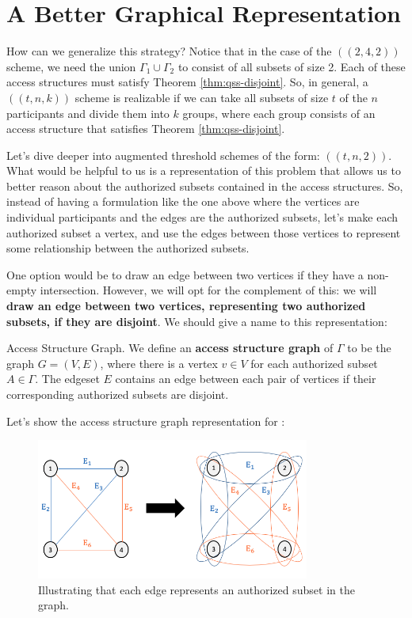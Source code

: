 \section{A Better Graphical Representation}

How can we generalize this strategy? Notice that in the case of the $((2,4,2))$ scheme, we need the union $\Gamma_1 \cup \Gamma_2$ to consist of all subsets of size 2. Each of these access structures must satisfy Theorem \ref{thm:qss-disjoint}. So, in general, a $((t,n,k))$ scheme is realizable if we can take all subsets of size $t$ of the $n$ participants and divide them into $k$ groups, where each group consists of an access structure that satisfies Theorem \ref{thm:qss-disjoint}. 

Let's dive deeper into augmented threshold schemes of the form: $((t,n,2))$. What would be helpful to us is a representation of this problem that allows us to better reason about the authorized subsets contained in the access structures. So, instead of having a formulation like the one above where the vertices are individual participants and the edges are the authorized subsets, let's make each authorized subset a vertex, and use the edges between those vertices to represent some relationship between the authorized subsets.

One option would be to draw an edge between two vertices if they have a non-empty intersection. However, we will opt for the complement of this: we will \textbf{draw an edge between two vertices, representing two authorized subsets, if they are disjoint}. We should give a name to this representation:

\begin{definition}{Access Structure Graph.}
	We define an \textbf{access structure graph} of $\Gamma$ to be the graph $G = (V,E)$, where there is a vertex $v \in V$ for each authorized subset $A \in \Gamma$. The edgeset $E$ contains an edge between each pair of vertices if their corresponding authorized subsets are disjoint.
\end{definition}

Let's show the access structure graph representation for :

\begin{figure}[ht]
	\begin{center}
		\includegraphics[width=0.8\textwidth]{Images/ch3-fig2.png}
	\end{center}
	\caption{Illustrating that each edge represents an authorized subset in the graph.}
	\label{fig:2-4-2-edge}
\end{figure}

